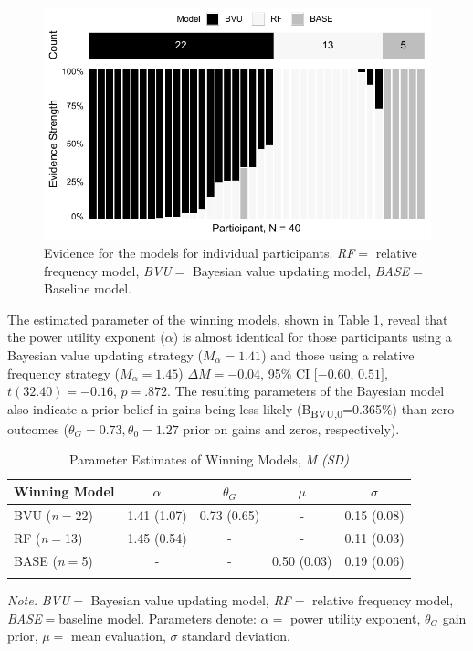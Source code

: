 \documentclass[a4paper, man, floatsintext]{apa6}
\begin{document}
\begin{figure}

{\centering \includegraphics{../figures/model_weights-1} 

}

\caption{Evidence for the models for individual participants. \textit{RF}$=$ relative frequency model, \textit{BVU}$=$ Bayesian value updating model, \textit{BASE}$=$ Baseline model.}\label{fig:model_weights}
\end{figure}

The estimated parameter of the winning models, shown in Table
\ref{tab:model_par}, reveal that the power utility exponent (\(\alpha\))
is almost identical for those participants using a Bayesian value
updating strategy (\(M_{\alpha}= 1.41\)) and those using a relative
frequency strategy (\(M_{\alpha}=1.45\)) \(\Delta M = -0.04\), 95\% CI
\([-0.60\), \(0.51]\), \(t(32.40) = -0.16\), \(p = .872\). The resulting
parameters of the Bayesian model also indicate a prior belief in gains
being less likely (B\textsubscript{BVU,0}=0.365\%) than zero outcomes
(\(\theta_G = 0.73, \theta_0 = 1.27\) prior on gains and zeros,
respectively).

\begin{table}[tbp]
\begin{center}
\begin{threeparttable}
\caption{\label{tab:model_par}Parameter Estimates of Winning Models, \textit{M (SD)}}
\begin{tabular}{lcccc}
\toprule
Winning Model & $\alpha$ & $\theta_G$ & $\mu$ & $\sigma$\\
\midrule
BVU (\textit{n}$=$22) & 1.41 (1.07) & 0.73 (0.65) & - & 0.15 (0.08)\\
RF (\textit{n}$=$13) & 1.45 (0.54) & - & - & 0.11 (0.03)\\
BASE (\textit{n}$=$5) & - & - & 0.50 (0.03) & 0.19 (0.06)\\
\bottomrule
\addlinespace
\end{tabular}
\begin{tablenotes}[para]
\normalsize{\textit{Note.} \textit{BVU}$=$ Bayesian value updating model, \textit{RF}$=$ relative frequency model, \textit{BASE}$=$baseline model. Parameters denote: $\alpha=$ power utility exponent, $\theta_G$ gain prior, $\mu=$ mean evaluation, $\sigma$ standard deviation.}
\end{tablenotes}
\end{threeparttable}
\end{center}
\end{table}
\end{document}
